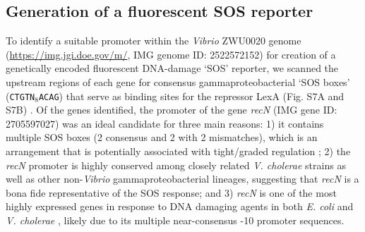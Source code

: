 \documentclass[12pt]{article}
\begin{document}
\subsection*{Generation of a fluorescent SOS reporter}
To identify a suitable promoter within the \textit{Vibrio} ZWU0020 genome (\url{https://img.jgi.doe.gov/m/}, IMG genome ID: 2522572152) for creation of a genetically encoded fluorescent DNA-damage `SOS' reporter, we scanned the upstream regions of each gene for consensus gammaproteobacterial `SOS boxes' (\texttt{CTGTN$_8$ACAG}) that serve as binding sites for the repressor LexA (Fig. S7A and S7B) \cite{erill2007aeons}. Of the genes identified, the promoter of the gene \textit{recN} (IMG gene ID: 2705597027) was an ideal candidate for three main reasons: 1) it contains multiple SOS boxes (2 consensus and 2 with 2 mismatches), which is an arrangement that is potentially associated with tight/graded regulation \cite{kreuzer2013dna}; 2) the \textit{recN} promoter is highly conserved among closely related \textit{V. cholerae} strains as well as other non-\textit{Vibrio} gammaproteobacterial lineages, suggesting that \textit{recN} is a bona fide representative of the SOS response; and 3) \textit{recN} is one of the most highly expressed genes in response to DNA damaging agents in both \textit{E. coli} and \textit{V. cholerae} \cite{courcelle2001comparative,Krin2018}, likely due to its multiple near-consensus -10 promoter sequences.
\end{document}
